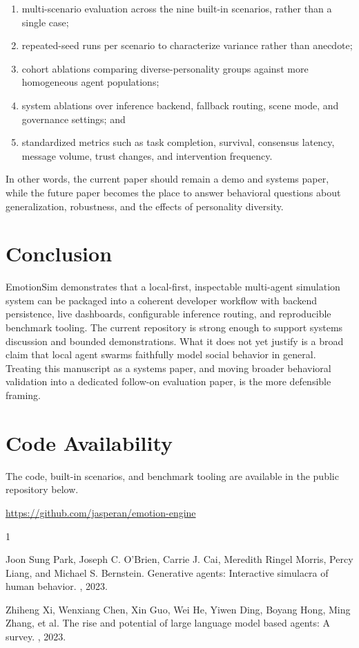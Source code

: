 \documentclass{article}
\begin{document}
\begin{enumerate}
    \item multi-scenario evaluation across the nine built-in scenarios, rather than a single case;
    \item repeated-seed runs per scenario to characterize variance rather than anecdote;
    \item cohort ablations comparing diverse-personality groups against more homogeneous agent populations;
    \item system ablations over inference backend, fallback routing, scene mode, and governance settings; and
    \item standardized metrics such as task completion, survival, consensus latency, message volume, trust changes, and intervention frequency.
\end{enumerate}

In other words, the current paper should remain a demo and systems paper, while the future paper becomes the place to answer behavioral questions about generalization, robustness, and the effects of personality diversity.

\section{Conclusion}
EmotionSim demonstrates that a local-first, inspectable multi-agent simulation system can be packaged into a coherent developer workflow with backend persistence, live dashboards, configurable inference routing, and reproducible benchmark tooling. The current repository is strong enough to support systems discussion and bounded demonstrations. What it does not yet justify is a broad claim that local agent swarms faithfully model social behavior in general. Treating this manuscript as a systems paper, and moving broader behavioral validation into a dedicated follow-on evaluation paper, is the more defensible framing.

\section*{Code Availability}
The code, built-in scenarios, and benchmark tooling are available in the public repository below.

\url{https://github.com/jasperan/emotion-engine}


\begin{thebibliography}{1}

Joon Sung Park, Joseph C. O'Brien, Carrie J. Cai, Meredith Ringel Morris, Percy Liang, and Michael S. Bernstein.
\newblock Generative agents: Interactive simulacra of human behavior.
, 2023.

Zhiheng Xi, Wenxiang Chen, Xin Guo, Wei He, Yiwen Ding, Boyang Hong, Ming Zhang, et al.
\newblock The rise and potential of large language model based agents: A survey.
, 2023.

\end{thebibliography}
\end{document}

